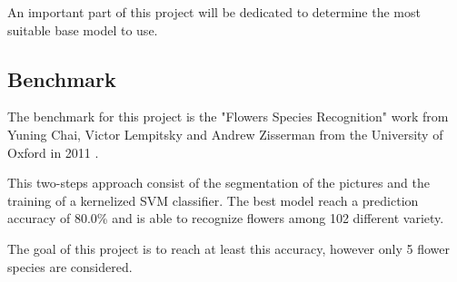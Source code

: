 An important part of this project will be dedicated to determine the most suitable base model to use.

\subsection{Benchmark}

The benchmark for this project is the "Flowers Species Recognition" work from Yuning Chai, Victor Lempitsky and Andrew Zisserman from the University of Oxford in 2011 \cite{Chai_BiCos, Chai_BiCos_demo} . 

This two-steps approach consist of the segmentation of the pictures and the training of a kernelized SVM classifier. The best model reach a prediction accuracy of 80.0\% and is able to recognize flowers among 102 different variety.

The goal of this project is to reach at least this accuracy, however only 5 flower species are considered. 


